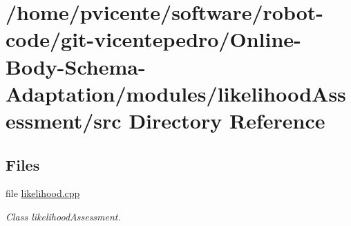 \section{/home/pvicente/software/robot-\/code/git-\/vicentepedro/\+Online-\/\+Body-\/\+Schema-\/\+Adaptation/modules/likelihood\+Assessment/src Directory Reference}
\label{dir_aef209741c50cefd8d656975cb5d57ff}
\subsection*{Files}
\begin{DoxyCompactItemize}
\item 
file \hyperlink{likelihood_8cpp}{likelihood.\+cpp}
\begin{DoxyCompactList}\small\item\em Class likelihood\+Assessment. \end{DoxyCompactList}\end{DoxyCompactItemize}
